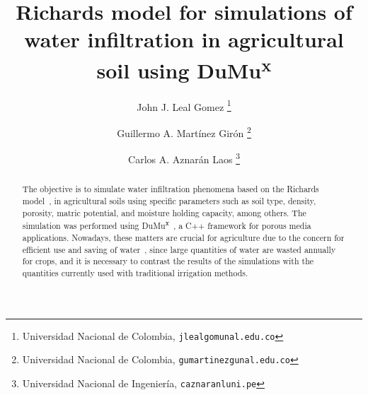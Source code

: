 \documentclass[a4paper,abstract=true]{scrartcl}
\date{}
\title{Richards model for simulations of water infiltration in agricultural soil using DuMu\textsuperscript{x}}
\author{John J. Leal Gomez
	\thanks{
		Universidad Nacional de Colombia,
		\texttt{jlealgom\MVAt unal.edu.co}}
    \and Guillermo A. Martínez Girón
    \thanks{
    Universidad Nacional de Colombia,
		\texttt{gumartinezg\MVAt unal.edu.co}}
    \and Carlos A. Aznarán Laos
    \thanks{
      Universidad Nacional de Ingeniería,
		\texttt{caznaranl\MVAt uni.pe}}
}
\begin{document}
\maketitle

\begin{abstract}
	The objective is to simulate water infiltration phenomena based on
	the Richards model~\cite{richards_capillary_1931}, in agricultural
	soils using specific parameters such as soil type, density,
	porosity, matric potential, and moisture holding capacity, among
	others.
	The simulation was performed using
	DuMu\textsuperscript{x}~\cite{Kochetal2020Dumux}, a C++ framework
	for porous media applications.
	Nowadays, these matters are crucial for agriculture due to the
	concern for efficient use and saving of water~\cite{colombia_2021},
	since large quantities of water are wasted annually for crops, and
	it is necessary to contrast the results of the simulations with the
	quantities currently used with traditional irrigation methods.
\end{abstract}


\end{document}
